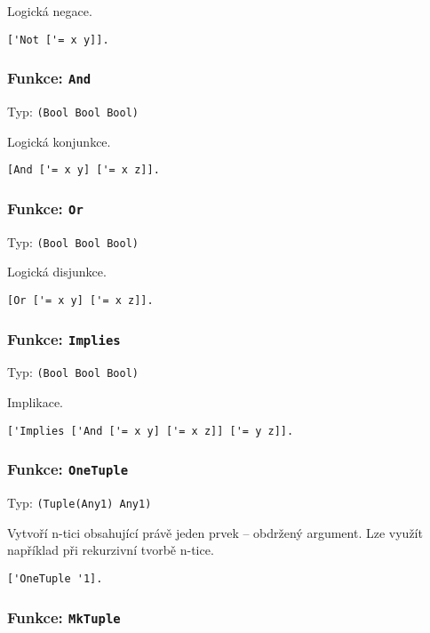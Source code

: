 Logická negace.

\begin{lstlisting}[caption={Ukázka využití Not}]
['Not ['= x y]].
\end{lstlisting}

\subsubsection*{Funkce: \lstinline{And}}
Typ: \lstinline{(Bool Bool Bool)}

Logická konjunkce.

\begin{lstlisting}[caption={Ukázka využití And}]
[And ['= x y] ['= x z]].
\end{lstlisting}

\subsubsection*{Funkce: \lstinline{Or}}
Typ: \lstinline{(Bool Bool Bool)}

Logická disjunkce.

\begin{lstlisting}[caption={Ukázka využití Or}]
[Or ['= x y] ['= x z]].
\end{lstlisting}

\subsubsection*{Funkce: \lstinline{Implies}}
Typ: \lstinline{(Bool Bool Bool)}

Implikace.

\begin{lstlisting}[caption={Ukázka využití Implies}]
['Implies ['And ['= x y] ['= x z]] ['= y z]].
\end{lstlisting}

\subsubsection*{Funkce: \lstinline{OneTuple}}
Typ: \lstinline{(Tuple(Any1) Any1)}

Vytvoří n-tici obsahující právě jeden prvek -- obdržený argument. Lze využít například při rekurzivní
tvorbě n-tice.

\begin{lstlisting}[caption={Ukázka využití OneTuple}]
['OneTuple '1].
\end{lstlisting}

\subsubsection*{Funkce: \lstinline{MkTuple}}

